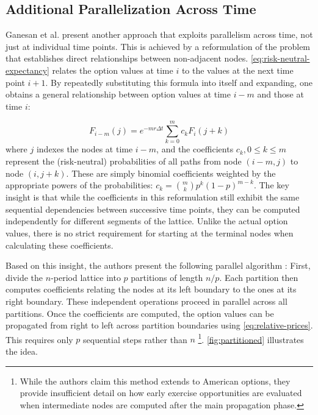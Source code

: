 \documentclass[english,12pt,a4paper,pdftex,sci,utf8]{aaltothesis}
\begin{document}
\subsection{Additional Parallelization Across Time}
Ganesan et al. \cite{ganesan2009acceleration} present another approach that exploits parallelism across time, not just at individual time points. This is achieved by a reformulation of the problem that establishes direct relationships between non-adjacent nodes. \cref{eq:risk-neutral-expectancy} relates the option values at time $i$ to the values at the next time point $i+1$. By repeatedly substituting this formula into itself and expanding, one obtains a general relationship between option values at time $i-m$ and those at time $i$:

\begin{equation}
    F_{i-m}(j) = e^{-m r \Delta t} \sum_{k=0}^m c_k F_i(j+k)
\label{eq:relative-prices}
\end{equation}
where $j$ indexes the nodes at time $i-m$, and the coefficients $c_k, 0 \leq k \leq m$ represent the (risk-neutral) probabilities of all paths from node $(i-m,j)$ to node $(i,j+k)$. These are simply binomial coefficients weighted by the appropriate powers of the probabilities: $c_k = \binom{m}{k}p^k(1-p)^{m-k}$. The key insight is that while the coefficients in this reformulation still exhibit the same sequential dependencies between successive time points, they can be computed independently for different segments of the lattice. Unlike the actual option values, there is no strict requirement for starting at the terminal nodes when calculating these coefficients.

Based on this insight, the authors present the following parallel algorithm \cite{ganesan2009acceleration}: First, divide the $n$-period lattice into $p$ partitions of length $n/p$. Each partition then computes coefficients relating the nodes at its left boundary to the ones at its right boundary. These independent operations proceed in parallel across all partitions. Once the coefficients are computed, the option values can be propagated from right to left across partition boundaries using \cref{eq:relative-prices}. This requires only $p$ sequential steps rather than $n$ \footnote{While the authors claim this method extends to American options, they provide insufficient detail on how early exercise opportunities are evaluated when intermediate nodes are computed after the main propagation phase.}. \cref{fig:partitioned} illustrates the idea.
\end{document}
